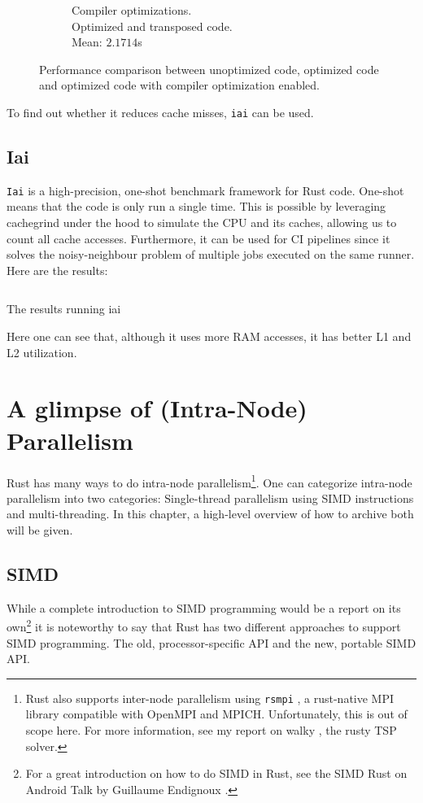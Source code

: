 \begin{figure}[H]
\begin{subfigure}{.5\textwidth}
  \caption{Compiler optimizations.\\\hspace*{0.6cm}Optimized and transposed code.\\\hspace*{0.6cm}Mean: $2.1714$s}
\end{subfigure}%
  \caption{Performance comparison between unoptimized code, optimized code and optimized code with compiler optimization enabled.}
\end{figure}

To find out whether it reduces cache misses, \texttt{iai} can be used.

\subsection{Iai}
\texttt{Iai} \cite{iai} is a high-precision, one-shot benchmark framework for Rust code. One-shot means that the code is only run a single time. This is possible by leveraging cachegrind \cite{cachegrind} under the hood to simulate the CPU and its caches, allowing us to count all cache accesses. Furthermore, it can be used for \ac{CI} pipelines since it solves the noisy-neighbour problem of multiple jobs executed on the same runner. Here are the results:

\begin{listing}[H]
  \inputminted{text}{./assets/iai.txt}
\caption{The results running iai}
\end{listing}

Here one can see that, although it uses more RAM accesses, it has better L1 and L2 utilization.

\section{A glimpse of (Intra-Node) Parallelism}
Rust has many ways to do intra-node parallelism\footnote{Rust also supports inter-node parallelism using \texttt{rsmpi} \cite{rsmpi}, a rust-native MPI library compatible with OpenMPI and MPICH. Unfortunately, this is out of scope here. For more information, see my report on walky \cite{walky}, the rusty TSP solver.}. One can categorize intra-node parallelism into two categories: Single-thread parallelism using SIMD instructions and multi-threading. In this chapter, a high-level overview of how to archive both will be given.

\subsection{SIMD}
While a complete introduction to \ac{SIMD} programming would be a report on its own\footnote{For a great introduction on how to do \ac{SIMD} in Rust, see the \ac{SIMD} Rust on Android Talk by Guillaume Endignoux \cite{simdtalk}.} it is noteworthy to say that Rust has two different approaches to support \ac{SIMD} programming. The old, processor-specific API and the new, portable SIMD API.

